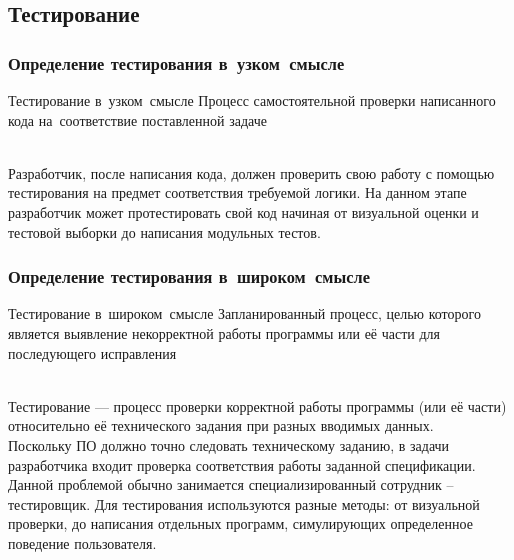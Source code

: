 \documentclass[lecturenotes]{../industrial-development}
\begin{document}
\subsection{Тестирование}
\begin{frame} \frametitle{Определение тестирования в~узком~смысле}
	\begin{block}{Тестирование в~узком~смысле}
		Процесс самостоятельной проверки написанного кода на~соответствие поставленной задаче
	\end{block}
\end{frame}
\lecturenotes
\\Разработчик, после написания кода, должен проверить свою работу с помощью тестирования на предмет соответствия требуемой логики. На данном этапе разработчик может протестировать свой код начиная от визуальной оценки и тестовой выборки до написания модульных тестов.

\begin{frame} \frametitle{Определение тестирования в~широком~смысле}
	\begin{block}{Тестирование в~широком~смысле}
		Запланированный процесс, целью которого является выявление некорректной работы программы или её части для последующего исправления
	\end{block}
\end{frame}
\lecturenotes
\\Тестирование --- процесс проверки корректной работы программы (или её части) относительно её технического задания при разных вводимых данных.\\
Поскольку ПО должно точно следовать техническому заданию, в задачи разработчика входит проверка соответствия работы заданной спецификации. Данной проблемой обычно занимается специализированный сотрудник – тестировщик. Для тестирования используются разные методы: от визуальной проверки, до написания отдельных программ, симулирующих определенное поведение пользователя.
\end{document}
